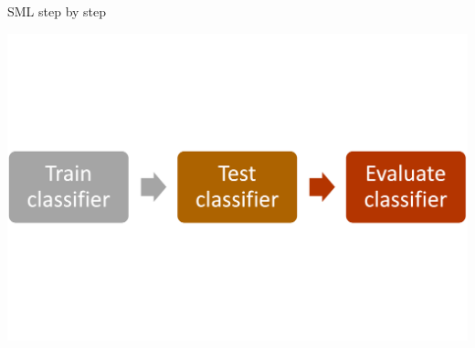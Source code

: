 \documentclass[handout]{beamer}
\begin{document}
	
	\begin{frame}{SML step by step}
		
		\begin{center}
			\includegraphics[width=\linewidth,height=\textheight,keepaspectratio]{../pictures/MLprocess.png} \\\
		\end{center}
		
		
		
		
		
		
		
		
	\end{frame}
	
	
	
\end{document}
